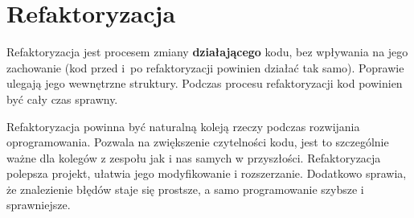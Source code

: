 \section{Refaktoryzacja}

Refaktoryzacja jest procesem zmiany \textbf{działającego} kodu, bez wpływania na jego zachowanie (kod przed i~po refaktoryzacji powinien działać tak samo). Poprawie ulegają jego wewnętrzne struktury. Podczas procesu refaktoryzacji kod powinien być cały czas sprawny. 

Refaktoryzacja powinna być naturalną koleją rzeczy podczas rozwijania oprogramowania. Pozwala na zwiększenie czytelności kodu, jest to szczególnie ważne dla kolegów z zespołu jak i nas samych w przyszłości. Refaktoryzacja polepsza projekt, ułatwia jego modyfikowanie i rozszerzanie. Dodatkowo sprawia, że znalezienie błędów staje się prostsze, a samo programowanie szybsze i sprawniejsze.

